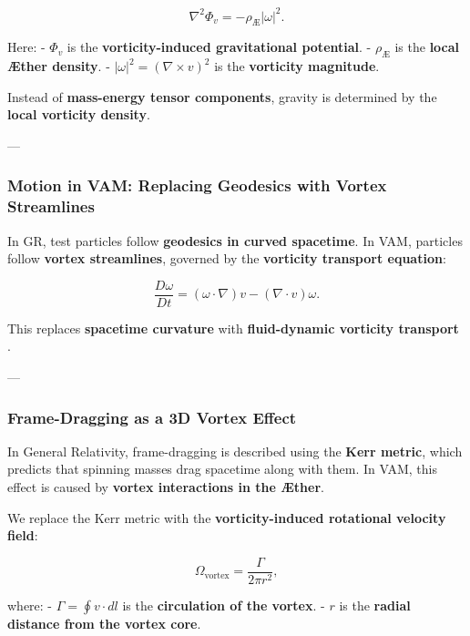 \begin{equation*}
    \nabla^2 \Phi_v = - \rho_\text{Æ} |\omega|^2.
\end{equation*}

Here:
- \( \Phi_v \) is the \textbf{vorticity-induced gravitational potential}.
- \( \rho_\text{Æ} \) is the \textbf{local Æther density}.
- \( |\omega|^2 = (\nabla \times v)^2 \) is the \textbf{vorticity magnitude}.

Instead of \textbf{mass-energy tensor components}, gravity is determined by the \textbf{local vorticity density}.

---

\subsubsection*{Motion in VAM: Replacing Geodesics with Vortex Streamlines}

In GR, test particles follow \textbf{geodesics in curved spacetime}. In VAM, particles follow \textbf{vortex streamlines}, governed by the \textbf{vorticity transport equation}:

\begin{equation*}
    \frac{D\omega}{Dt} = (\omega \cdot \nabla) v - (\nabla \cdot v) \omega.
\end{equation*}

This replaces \textbf{spacetime curvature} with \textbf{fluid-dynamic vorticity transport} \cite{lamb_hydrodynamics,feynman_superfluid}.

---

\subsubsection*{Frame-Dragging as a 3D Vortex Effect}

In General Relativity, frame-dragging is described using the \textbf{Kerr metric}, which predicts that spinning masses drag spacetime along with them. In VAM, this effect is caused by \textbf{vortex interactions in the Æther}.

We replace the Kerr metric with the \textbf{vorticity-induced rotational velocity field}:

\begin{equation*}
    \Omega_\text{vortex} = \frac{\Gamma}{2\pi r^2},
\end{equation*}

where:
- \( \Gamma = \oint v \cdot dl \) is the \textbf{circulation of the vortex}.
- \( r \) is the \textbf{radial distance from the vortex core}.

